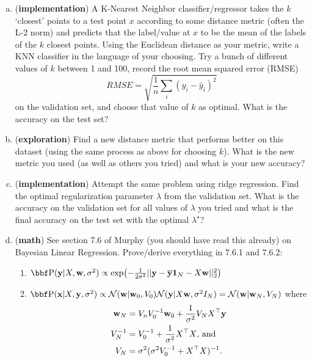 \documentclass[12pt,letterpaper,fleqn]{hmcpset}
\begin{document}
\begin{enumerate}[(a)]
    \item (\textbf{implementation}) A K-Nearest Neighbor classifier/regressor
        takes the $k$ `closest' points to a test point $x$ according to some
        distance metric (often the L-2 norm) and predicts that the label/value
        at $x$ to be the mean of the labels of the $k$ closest points. Using
        the Euclidean distance as your metric, write a KNN classifier in the
        language of your choosing. Try a bunch of different values of $k$ between
        1 and 100, record the root mean squared error (RMSE)
        \[
            RMSE = \sqrt{\frac{1}{n}\sum_i (y_i - \hat y_i)^2}
        \]
        on the validation set, and choose that
        value of $k$ as optimal. What is the accuracy on the test set?
    \item (\textbf{exploration}) Find a new distance metric that performs
        better on this dataset (using the same process as above for choosing
        $k$). What is the new metric you used (as well as others you tried)
        and what is your new accuracy?
    \item (\textbf{implementation}) Attempt the same problem using ridge
        regression. Find the optimal regularization parameter $\lambda$
        from the validation set. What is the accuracy on the validation set
        for all values of $\lambda$ you tried and what is the final accuracy
        on the test set with the optimal $\lambda^\star$?
    \item (\textbf{math}) See section 7.6 of Murphy (you should have read this
        already) on Bayesian Linear Regression. Prove/derive everything in 7.6.1
        and 7.6.2:
        \begin{enumerate}
            \item $\PP(\yy | X,\ww, \sigma^2) \propto \exp \bigl(-\frac{1}{2\sigma^2}||\yy - \overline \yy \1_N - X\ww||_2^2\bigr)$\\
            \item $\PP(\xx|X,\yy,\sigma^2) \propto \Nc(\ww|\ww_0,V_0)\Nc(\yy|X\ww,\sigma^2 I_N) = \Nc(\ww|\ww_N, V_N)$ where
                \begin{align*}
                    {\bf w}_N &= V_n V_0^{-1}{\bf w}_0 + \frac{1}{\sigma^2}V_N X^\top {\bf y}\\
                    V_N^{-1} &= V_0^{-1} + \frac{1}{\sigma^2}X^\top X\text{, and}\\
                    V_N &= \sigma^2(\sigma^2 V_0^{-1} + X^\top X)^{-1}.
                \end{align*}

\end{enumerate}
\end{enumerate}
\end{document}
